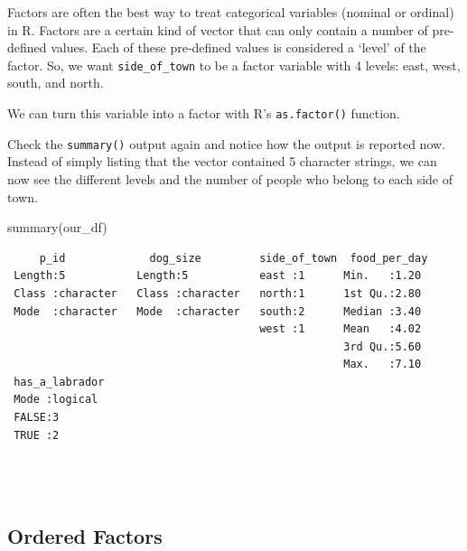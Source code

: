 \documentclass[
  letterpaper,
  DIV=11,
  numbers=noendperiod]{scrreprt}
\newenvironment{Shaded}{\begin{snugshade}}{\end{snugshade}}
\newcommand{\FunctionTok}[1]{\textcolor[rgb]{0.28,0.35,0.67}{#1}}
\newcommand{\NormalTok}[1]{\textcolor[rgb]{0.00,0.23,0.31}{#1}}
\newcommand{\OtherTok}[1]{\textcolor[rgb]{0.00,0.23,0.31}{#1}}
\newcommand{\SpecialCharTok}[1]{\textcolor[rgb]{0.37,0.37,0.37}{#1}}
\begin{document}
Factors are often the best way to treat categorical variables (nominal
or ordinal) in R. Factors are a certain kind of vector that can only
contain a number of pre-defined values. Each of these pre-defined values
is considered a `level' of the factor. So, we want
\texttt{side\_of\_town} to be a factor variable with 4 levels: east,
west, south, and north.

We can turn this variable into a factor with R's \texttt{as.factor()}
function.

\begin{Shaded}
\end{Shaded}

Check the \texttt{summary()} output again and notice how the output is
reported now. Instead of simply listing that the vector contained 5
character strings, we can now see the different levels and the number of
people who belong to each side of town.

\begin{Shaded}
\begin{Highlighting}[]
\FunctionTok{summary}\NormalTok{(our\_df)}
\end{Highlighting}
\end{Shaded}

\begin{verbatim}
     p_id             dog_size         side_of_town  food_per_day 
 Length:5           Length:5           east :1      Min.   :1.20  
 Class :character   Class :character   north:1      1st Qu.:2.80  
 Mode  :character   Mode  :character   south:2      Median :3.40  
                                       west :1      Mean   :4.02  
                                                    3rd Qu.:5.60  
                                                    Max.   :7.10  
 has_a_labrador 
 Mode :logical  
 FALSE:3        
 TRUE :2        
                
                
                
\end{verbatim}

\subsection{Ordered Factors}\label{ordered-factors}
\end{document}
